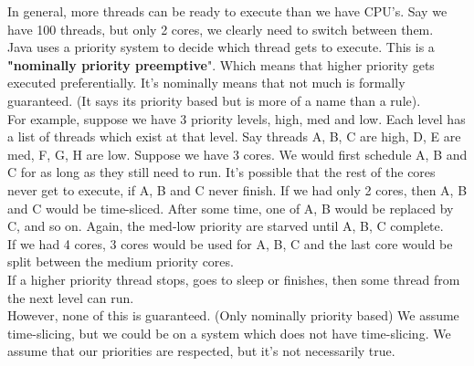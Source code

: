 \documentclass[12pt]{article}
\theoremstyle{definition}
\begin{document}
In general, more threads can be ready to execute than we have CPU's. Say we have 100 threads, but only 2 cores, we clearly need to switch between them. 
\\ \linebreak
Java uses a priority system to decide which thread gets to execute. This is a \textbf{"nominally priority preemptive}". Which means that higher priority gets executed preferentially. It's nominally means that not much is formally guaranteed. (It says its priority based but is more of a name than a rule). 
\\ \linebreak
For example, suppose we have 3 priority levels, high, med and low. Each level has a list of threads which exist at that level. Say threads A, B, C are high, D, E are med, F, G, H are low. Suppose we have 3 cores. We would first schedule A, B and C for as long as they still need to run. It's possible that the rest of the cores never get to execute, if A, B and C never finish. 
If we had only 2 cores, then A, B and C would be time-sliced. After some time, one of A, B would be replaced by C, and so on. Again, the med-low priority are starved until A, B, C complete. 
\\ \linebreak
If we had 4 cores, 3 cores would be used for A, B, C and the last core would be split between the medium priority cores. 
\\ \linebreak
If a higher priority thread stops, goes to sleep or finishes, then some thread from the next level can run. 
\\ \linebreak
However, none of this is guaranteed. (Only nominally priority based) We assume time-slicing, but we could be on a system which does not have time-slicing. We assume that our priorities are respected, but it's not necessarily true. 
\end{document}
